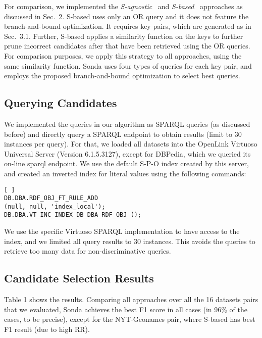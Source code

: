 For comparison, we implemented the \emph{S-agnostic}~\cite{papadakis_efficient_2011} and \emph{S-based}~\cite{DBLP:conf/semweb/SongH11} approaches as discussed in Sec.~2. S-based uses only an OR query and it does not feature the branch-and-bound optimization. It requires key pairs, which are generated as in Sec.~3.1. Further, S-based applies a similarity function on the keys to further prune incorrect candidates after that have been retrieved using the OR queries. For comparison purposes, we apply this strategy to all approaches, using the same similarity function. Sonda uses four types of queries for each key pair, and employs the proposed branch-and-bound optimization to select best queries. 

\subsection{Querying Candidates} 
We implemented the queries in our algorithm as SPARQL queries (as discussed before) and directly query a SPARQL endpoint to obtain results (limit to 30 instances per query). For that, we loaded all datasets into the OpenLink Virtuoso Universal Server (Version 6.1.5.3127), except for DBPedia, which we queried its on-line sparql endpoint. We use the default S-P-O index created by this server, and created an inverted index for literal values using the following commands:

\lstset{basicstyle=\small}
\begin{lstlisting}[ ]   
DB.DBA.RDF_OBJ_FT_RULE_ADD 
(null, null, 'index_local');
DB.DBA.VT_INC_INDEX_DB_DBA_RDF_OBJ (); 
\end{lstlisting}

We use the specific Virtuoso SPARQL implementation to have access to the index, and we limited all query results to 30 instances. This avoids the queries to retrieve too many data for non-discriminative queries.

\subsection{Candidate Selection Results} 
Table 1 shows the results. Comparing all approaches over all the 16 datasets pairs that we evaluated, Sonda achieves the best F1 score in all cases (in 96\% of the cases, to be precise), except for the NYT-Geonames pair, where S-based has best F1 result (due to high RR). 
 
